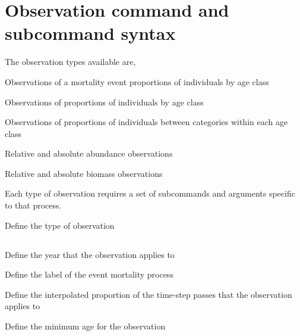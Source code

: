 \section{Observation command and subcommand syntax\label{sec:observation-syntax}}

The observation types available are, 

\begin{description}
  \item Observations of a mortality event proportions of individuals by age class
  \item Observations of proportions of individuals by age class
  \item Observations of proportions of individuals between categories within each age class
  \item Relative and absolute abundance observations
  \item Relative and absolute biomass observations
\end{description}

Each type of observation requires a set of subcommands and arguments specific to that process.


 {Define the type of observation}

\subsection[Event mortality-at-age]{} 

 {Define the year that the observation applies to}

 {Define the label of the event mortality process}

 {Define the interpolated proportion of the time-step passes that the observation applies to}

 {Define the minimum age for the observation}

